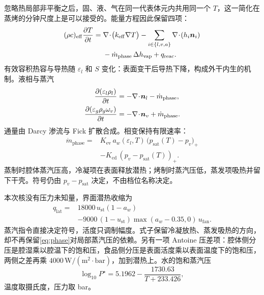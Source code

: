 忽略热局部非平衡之后，固、液、气在同一代表体元内共用同一个 \(T\)，这一简化在蒸烤的分钟尺度上是可以接受的。能量方程因此保留四项：
\begin{equation}
\label{eq:energy}
\begin{aligned}
(\rho c)_{\mathrm{eff}}\frac{\partial T}{\partial t}
={}&\nabla\!\cdot\!\big(k_{\mathrm{eff}}\nabla T\big)
-\sum_{i\in\{l,v,a\}}\nabla\!\cdot\!(h_i\bm{n}_i)\\
&-\dot m_{\mathrm{phase}}\,\Delta h_{\mathrm{vap}}
+q_{\mathrm{reac}}.
\end{aligned}
\end{equation}
有效容积热容与导热随 \(\varepsilon_l\) 和 \(S\) 变化：表面变干后导热下降，构成外干内生的机制。液相与蒸汽
\begin{align}
\label{eq:liquid}
\frac{\partial(\varepsilon_l\rho_l)}{\partial t}
&=-\nabla\!\cdot\!\bm{n}_l-\dot m_{\mathrm{phase}},\\
\label{eq:vapor}
\frac{\partial(\varepsilon_g\rho_g\omega_v)}{\partial t}
&=-\nabla\!\cdot\!\bm{n}_v+\dot m_{\mathrm{phase}}.
\end{align}
通量由 Darcy 渗流与 Fick 扩散合成。相变保持有限速率：
\begin{equation}
\label{eq:phase}
\begin{aligned}
\dot m_{\mathrm{phase}}
={}&K_{\mathrm{ev}}\,a_w(\varepsilon_l,T)\,
\big(p_{\mathrm{sat}}(T)-p_v\big)_+\\
&-K_{\mathrm{cd}}\,(p_v-p_{\mathrm{sat}}(T))_+.
\end{aligned}
\end{equation}
蒸制时腔体蒸汽压高，冷凝项在表面释放潜热；烤制时蒸汽压低，蒸发项吸热并留下干壳。符号仍由 \(p_v-p_{\mathrm{sat}}\) 决定，不由档位名称决定。

本次核没有压力未知量，界面潜热收缩为
\begin{equation}
\label{eq:qlat}
\begin{aligned}
q_{\mathrm{lat}}={}&18000\,u_{\mathrm{st}}(1-a_w)\\
&-9000\,(1-u_{\mathrm{st}})\max(a_w-0.35,0)\,u_{\mathrm{fan}}.
\end{aligned}
\end{equation}
蒸汽指令直接决定符号，活度只调制幅度。式子保留冷凝放热、蒸发吸热的方向，却不再保留\eqref{eq:phase}对局部蒸汽压的依赖。另有一项 Antoine 压差项：腔体侧分压是腔湿乘以腔温下的饱和压，食品侧分压是表面活度乘以表面温度下的饱和压，两侧之差再乘 \(4000\,\mathrm{W}/(\mathrm{m}^2\cdot\mathrm{bar})\)，加到潜热上。水的饱和蒸汽压
\begin{equation}
\label{eq:antoine}
\log_{10} P^\star = 5.1962 - \frac{1730.63}{T+233.426},
\end{equation}
温度取摄氏度，压力取 bar。

